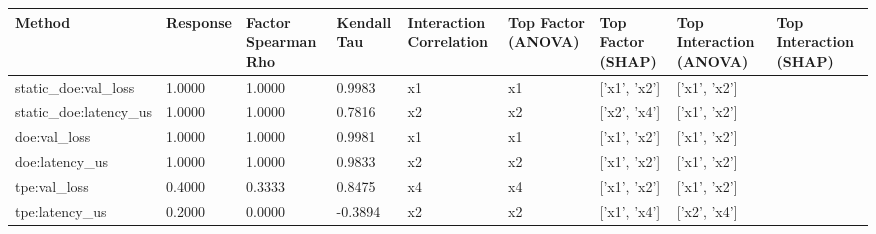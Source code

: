 \begin{tabular}{llllllll}
\toprule
Method & Response & Factor Spearman Rho & Kendall Tau & Interaction Correlation & Top Factor (ANOVA) & Top Factor (SHAP) & Top Interaction (ANOVA) & Top Interaction (SHAP) \\
\midrule
static_doe:val_loss & 1.0000 & 1.0000 & 0.9983 & x1 & x1 & ['x1', 'x2'] & ['x1', 'x2'] \\
static_doe:latency_us & 1.0000 & 1.0000 & 0.7816 & x2 & x2 & ['x2', 'x4'] & ['x1', 'x2'] \\
doe:val_loss & 1.0000 & 1.0000 & 0.9981 & x1 & x1 & ['x1', 'x2'] & ['x1', 'x2'] \\
doe:latency_us & 1.0000 & 1.0000 & 0.9833 & x2 & x2 & ['x1', 'x2'] & ['x1', 'x2'] \\
tpe:val_loss & 0.4000 & 0.3333 & 0.8475 & x4 & x4 & ['x1', 'x2'] & ['x1', 'x2'] \\
tpe:latency_us & 0.2000 & 0.0000 & -0.3894 & x2 & x2 & ['x1', 'x4'] & ['x2', 'x4'] \\
\bottomrule
\end{tabular}
